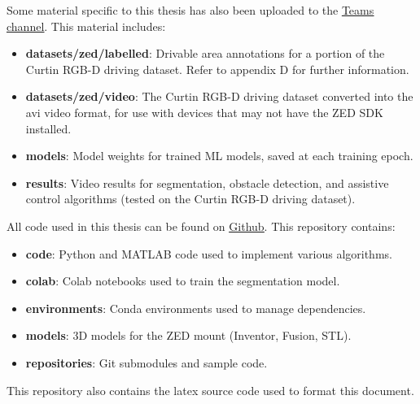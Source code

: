 Some material specific to this thesis has also been uploaded to the \href{https://curtin.sharepoint.com/:f:/r/sites/CurtinXGlide/Shared%20Documents/Navigation%20and%20Object%20Detection/Jakob?csf=1&web=1&e=KUuiUt}{\underline{Teams channel}}.
This material includes:
\begin{itemize}
    \item \textbf{datasets/zed/labelled}: Drivable area annotations for a portion of the Curtin RGB-D driving dataset. Refer to appendix D for further information.
    \item \textbf{datasets/zed/video}: The Curtin RGB-D driving dataset converted into the avi video format, for use with devices that may not have the ZED SDK installed.
    \item \textbf{models}: Model weights for trained ML models, saved at each training epoch.
    \item \textbf{results}: Video results for segmentation, obstacle detection, and assistive control algorithms (tested on the Curtin RGB-D driving dataset).
\end{itemize}

All code used in this thesis can be found on \href{https://github.com/JakobWyatt/smart-wheelchair}{\underline{Github}}.
This repository contains:
\begin{itemize}
    \item \textbf{code}: Python and MATLAB code used to implement various algorithms.
    \item \textbf{colab}: Colab notebooks used to train the segmentation model.
    \item \textbf{environments}: Conda environments used to manage dependencies.
    \item \textbf{models}: 3D models for the ZED mount (Inventor, Fusion, STL).
    \item \textbf{repositories}: Git submodules and sample code.
\end{itemize}
This repository also contains the latex source code used to format this document.
